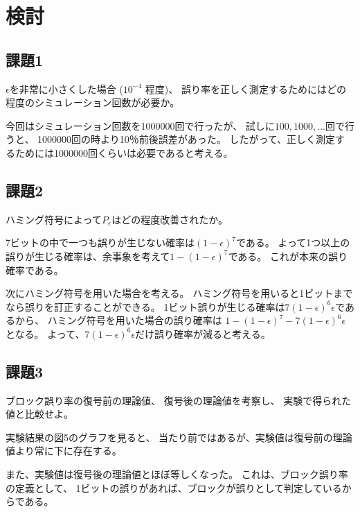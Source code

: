 \documentclass[12pt]{jarticle}
\begin{document}
\section{検討}
\subsection{課題1}
\begin{shadebox}
    $\epsilon$を非常に小さくした場合 ($10^{-4}$ 程度)、
    誤り率を正しく測定するためにはどの程度のシミュレーション回数が必要か。
\end{shadebox}

今回はシミュレーション回数を1000000回で行ったが、
試しに$100,1000,...$回で行うと、
1000000回の時より10％前後誤差があった。
したがって、正しく測定するためには1000000回くらいは必要であると考える。

\clearpage

\subsection{課題2}
\begin{shadebox}
    ハミング符号によって$P_e$はどの程度改善されたか。
\end{shadebox}

7ビットの中で一つも誤りが生じない確率は$(1-\epsilon)^7$である。
よって1つ以上の誤りが生じる確率は、余事象を考えて$1-(1-\epsilon)^7$である。
これが本来の誤り確率である。

次にハミング符号を用いた場合を考える。
ハミング符号を用いると1ビットまでなら誤りを訂正することができる。
1ビット誤りが生じる確率は$7(1-\epsilon)^6 \epsilon$であるから、
ハミング符号を用いた場合の誤り確率は
$1-(1-\epsilon)^7-7(1-\epsilon)^6 \epsilon$となる。
よって、$7(1-\epsilon)^6 \epsilon$だけ誤り確率が減ると考える。

\subsection{課題3}
\begin{shadebox}
    ブロック誤り率の復号前の理論値、
    復号後の理論値を考察し、
    実験で得られた値と比較せよ。
\end{shadebox}

実験結果の図5のグラフを見ると、
当たり前ではあるが、実験値は復号前の理論値より常に下に存在する。

また、実験値は復号後の理論値とほぼ等しくなった。
これは、ブロック誤り率の定義として、
1ビットの誤りがあれば、ブロックが誤りとして判定しているからである。
\end{document}
